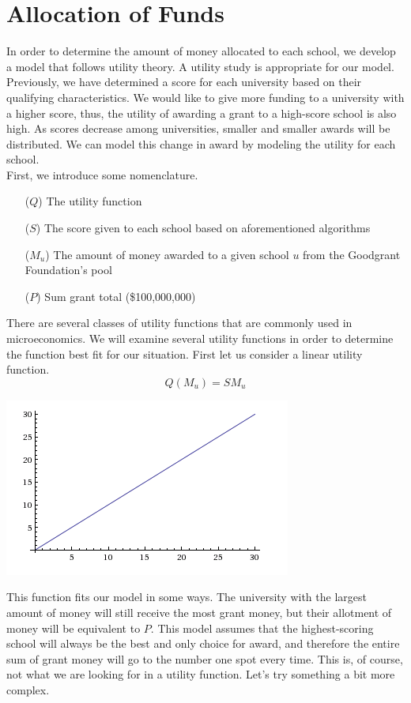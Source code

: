 \documentclass[paper.tex]{subfiles}
\begin{document}
	\section{Allocation of Funds}
	
	In order to determine the amount of money allocated to each school, we develop a model that follows utility theory. A utility study is appropriate for our model. Previously, we have determined a score for each university based on their qualifying characteristics. We would like to give more funding to a university with a higher score, thus, the utility of awarding a grant to a high-score school is also high. As scores decrease among universities, smaller and smaller awards will be distributed. We can model this change in award by modeling the utility for each school.
	\\
	
	First, we introduce some nomenclature.
	\begin{itemize}
		\item[($Q$)] The utility function
		\item[($S$)] The score given to each school based on aforementioned algorithms
		\item[($M_u$)] The amount of money awarded to a given school $u$ from the Goodgrant Foundation's pool
		\item[($P$)] Sum grant total (\$100,000,000)
	\end{itemize}
	There are several classes of utility functions that are commonly used in microeconomics. We will examine several utility functions in order to determine the function best fit for our situation. First let us consider a linear utility function.
	$$ Q(M_u) = SM_u $$
	
	\begin{center}
		\includegraphics[width=0.5\linewidth]{images/UF1}
	\end{center}
	This function fits our model in some ways. The university with the largest amount of money will still receive the most grant money, but their allotment of money will be equivalent to $P$. This model assumes that the highest-scoring school will always be the best and only choice for award, and therefore the entire sum of grant money will go to the number one spot every time. This is, of course, not what we are looking for in a utility function. Let's try something a bit more complex.
	\\
	
\end{document}
